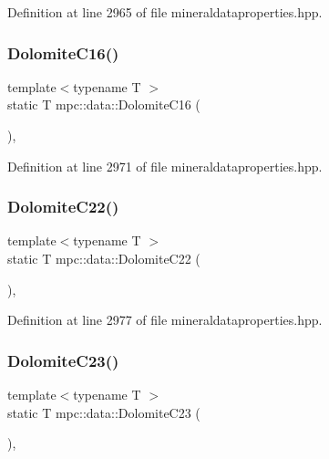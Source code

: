 Definition at line 2965 of file mineraldataproperties.\+hpp.

\mbox{\label{namespacempc_1_1data_a55ae58636a2c30a0b7d2c6decef19aea}} 
\subsubsection{\texorpdfstring{Dolomite\+C16()}{DolomiteC16()}}
{\footnotesize\ttfamily template$<$typename T $>$ \\
static T mpc\+::data\+::\+Dolomite\+C16 (\begin{DoxyParamCaption}{ }\end{DoxyParamCaption})\hspace{0.3cm}{\ttfamily [inline]}, {\ttfamily [static]}}



Definition at line 2971 of file mineraldataproperties.\+hpp.

\mbox{\label{namespacempc_1_1data_aa9f934047b1829f83b57763ee6b733f7}} 
\subsubsection{\texorpdfstring{Dolomite\+C22()}{DolomiteC22()}}
{\footnotesize\ttfamily template$<$typename T $>$ \\
static T mpc\+::data\+::\+Dolomite\+C22 (\begin{DoxyParamCaption}{ }\end{DoxyParamCaption})\hspace{0.3cm}{\ttfamily [inline]}, {\ttfamily [static]}}



Definition at line 2977 of file mineraldataproperties.\+hpp.

\mbox{\label{namespacempc_1_1data_a1374a3e15c7252506bf3007a2331f722}} 
\subsubsection{\texorpdfstring{Dolomite\+C23()}{DolomiteC23()}}
{\footnotesize\ttfamily template$<$typename T $>$ \\
static T mpc\+::data\+::\+Dolomite\+C23 (\begin{DoxyParamCaption}{ }\end{DoxyParamCaption})\hspace{0.3cm}{\ttfamily [inline]}, {\ttfamily [static]}}



